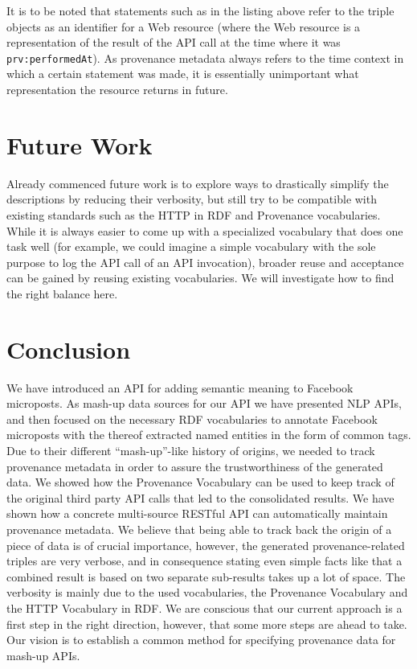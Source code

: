 \documentclass[twocolumn]{article}
\begin{document}
It is to be noted that statements such as in the listing above refer to the triple objects as an identifier for a Web resource (where the Web resource is a representation of the result of the API call at the time where it was \texttt{prv:performedAt}). As provenance metadata always refers to the time context in which a certain statement was made, it is essentially unimportant what representation the resource returns in future.

\section{Future Work} \label{sec:future}
Already commenced future work is to explore ways to drastically simplify the descriptions by reducing their verbosity, but still try to be compatible with existing standards such as the HTTP in RDF and Provenance vocabularies. While it is always easier to come up with a specialized vocabulary that does one task well (for example, we could imagine a simple vocabulary with the sole purpose to log the API call of an API invocation), broader reuse and acceptance can be gained by reusing existing vocabularies. We will investigate how to find the right balance here.

\section{Conclusion}                                                        \label{sec:conclusion}
We have introduced an API for adding semantic meaning to Facebook microposts. As mash-up data sources for our API we have presented NLP APIs, and then focused on the necessary RDF vocabularies to annotate Facebook microposts with the thereof extracted named entities in the form of common tags. Due to their different ``mash-up''-like history of origins, we needed to track provenance metadata in order to assure the trustworthiness of the generated data. We showed how the Provenance Vocabulary can be used to keep track of the original third party API calls that led to the consolidated results. We have shown how a concrete multi-source RESTful API can automatically maintain provenance metadata. We believe that being able to track back the origin of a piece of data is of crucial importance, however, the generated provenance-related triples are very verbose, and in consequence stating even simple facts like that a combined result is based on two separate sub-results takes up a lot of space. The verbosity is mainly due to the used vocabularies, the Provenance Vocabulary and the HTTP Vocabulary in RDF. We are conscious that our current approach is a first step in the right direction, however, that some more steps are ahead to take. Our vision is to establish a common method for specifying provenance data for mash-up APIs.
\end{document}

